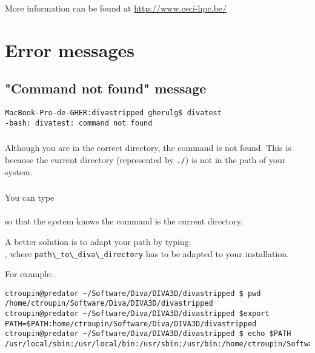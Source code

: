 More information can be found at \url{http://www.ceci-hpc.be/}


\section{Error messages}



\subsection{"Command not found" message}

\begin{lstlisting}[style=Bash]
MacBook-Pro-de-GHER:divastripped gherulg$ divatest
-bash: divatest: command not found
\end{lstlisting}


\subsubsection{\question}

Although you are in the correct directory, the command is not found. This is because the current directory (represented by \texttt{./}) is not in the path of your system. 

\subsubsection{\answer}

You can type \\
\\
so that the system knows the command is the current directory.

A better solution is to adapt your path by typing:\\
, where \verb|path\_to\_diva\_directory| has to be adapted to your installation.

For example:
\begin{lstlisting}[style=Bash]
ctroupin@predator ~/Software/Diva/DIVA3D/divastripped $ pwd
/home/ctroupin/Software/Diva/DIVA3D/divastripped
ctroupin@predator ~/Software/Diva/DIVA3D/divastripped $export  PATH=$PATH:home/ctroupin/Software/Diva/DIVA3D/divastripped
ctroupin@predator ~/Software/Diva/DIVA3D/divastripped $ echo $PATH
/usr/local/sbin:/usr/local/bin:/usr/sbin:/usr/bin:/home/ctroupin/Software/Diva/DIVA3D/divastripped/
\end{lstlisting}

